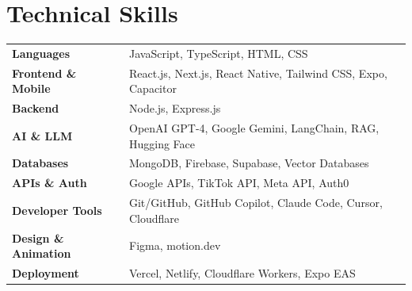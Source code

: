 \documentclass[a4,10pt]{article}
\newcommand{\hskills}[1]{
\textbf{\bfseries #1} }
\begin{document}
\vspace{0.05cm}

\section{Technical Skills}
\begin{tabular}{p{11em} p{44em}}

\hskills{Languages} & JavaScript, TypeScript, HTML, CSS \\

\hskills{Frontend \& Mobile} & React.js, Next.js, React Native, Tailwind CSS, Expo, Capacitor \\

\hskills{Backend} & Node.js, Express.js \\

\hskills{AI \& LLM} & OpenAI GPT-4, Google Gemini, LangChain, RAG, Hugging Face \\

\hskills{Databases} & MongoDB, Firebase, Supabase, Vector Databases \\

\hskills{APIs \& Auth} & Google APIs, TikTok API, Meta API, Auth0 \\

\hskills{Developer Tools} & Git/GitHub, GitHub Copilot, Claude Code, Cursor, Cloudflare \\

\hskills{Design \& Animation} & Figma, motion.dev \\

\hskills{Deployment} & Vercel, Netlify, Cloudflare Workers, Expo EAS \\

\end{tabular}
\vspace{-0.2cm}
\end{document}
